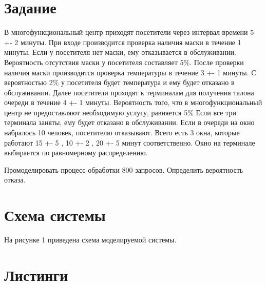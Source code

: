
\section*{Задание}
В многофункциональный центр приходят посетители через интервал времени 5 +- 2 минуты. При входе производится проверка наличия маски в течение 1 минуты. Если у посетителя нет маски, ему отказывается в обслуживании. Вероятность отсутствия маски у посетителя составляет 5\%. После проверки наличия маски производится проверка температуры в течение 3 +- 1 минуты. С вероятностью 2\% у посетителя будет температура и ему будет отказано в обслуживании. Далее посетители проходят к терминалам для получения талона очереди в течение 4 +- 1 минуты. Вероятность того, что в многофункциональный центр не предоставляют необходимую услугу, равняется 5\% Если все три терминала заняты, ему будет отказано в обслуживании. Если в очереди на окно набралось 10 человек, посетителю 
отказывают. Всего есть 3 окна, которые работают 15 +- 5 , 10 
+- 2 , 20 +- 5 минут соответственно. Окно на терминале выбирается по равномерному распределению.

Промоделировать процесс обработки 800 запросов. Определить вероятность отказа.



\section*{Схема системы}
На рисунке 1 приведена схема моделируемой системы.


\section*{Листинги}



